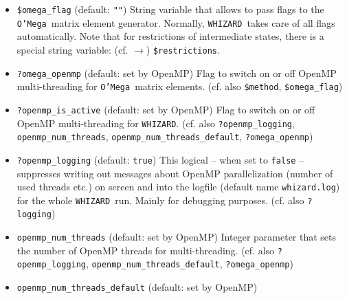 \documentclass[12pt]{book}
\newcommand{\ttt}[1]{\texttt{#1}}
\newcommand{\whizard}{\texttt{WHIZARD}}
\newcommand{\oMega}{\texttt{O'Mega}}
\begin{document}
\begin{itemize}
\ttt{\$obs\_unit = "{\em <LaTeX\_Code>}"} that allows to attach a \LaTeX\
physical unit to a plotted or histogrammed observable. (cf. also 
\ttt{n\_bins}, \ttt{?normalize\_bins}, \ttt{\$obs\_unit},
\ttt{\$title}, \ttt{\$description}, \ttt{\$x\_label},
\ttt{\$y\_label}, \ttt{?y\_log}, \ttt{?x\_log},
\ttt{graph\_width\_mm}, \ttt{graph\_height\_mm}, 
\ttt{x\_min}, \ttt{x\_max}, \ttt{y\_min}, \ttt{y\_max},
\ttt{\$gmlcode\_bg}, \ttt{\$gmlcode\_fg}, \ttt{?draw\_base},
\ttt{?draw\_histogram}, \ttt{?fill\_curve}, \ttt{?draw\_piecewise}, 
\ttt{?draw\_curve}, \ttt{?draw\_errors}, \ttt{\$symbol}, 
\ttt{?draw\_symbols}, \ttt{\$fill\_options}, \ttt{\$draw\_options},
\ttt{\$err\_options})
\item
\ttt{\$omega\_flag} \qquad (default: \ttt{""}) \newline
String variable that allows to pass flags to the \oMega\ matrix
element generator. Normally, \whizard\ takes care of all flags
automatically. Note that for restrictions of intermediate states,
there is a special string variable: (cf. $\to$) \ttt{\$restrictions}.
\item
\ttt{?omega\_openmp} \qquad (default: set by OpenMP) \newline
Flag to switch on or off OpenMP multi-threading for \oMega\ matrix
elements. (cf. also \ttt{\$method}, \ttt{\$omega\_flag})
\item
\ttt{?openmp\_is\_active} \qquad (default: set by OpenMP) \newline
Flag to switch on or off OpenMP multi-threading for
\whizard. (cf. also \ttt{?openmp\_logging},
\ttt{openmp\_num\_threads}, \ttt{openmp\_num\_threads\_default},
\ttt{?omega\_openmp})
\item
\ttt{?openmp\_logging} \qquad (default: \ttt{true}) \newline
This logical -- when set to \ttt{false} -- suppresses writing out
messages about OpenMP parallelization (number of used threads etc.) on
screen and into the logfile (default name \ttt{whizard.log}) for the
whole \whizard\ run. Mainly for debugging purposes. 
(cf. also \ttt{?logging})
\item
\ttt{openmp\_num\_threads} \qquad (default: set by OpenMP) \newline
Integer parameter that sets the number of OpenMP threads for
multi-threading.  (cf. also \ttt{?openmp\_logging},
\ttt{openmp\_num\_threads\_default},
\ttt{?omega\_openmp})
\item
\ttt{openmp\_num\_threads\_default} \qquad (default: set by OpenMP) \newline

\end{itemize}
\end{document}
